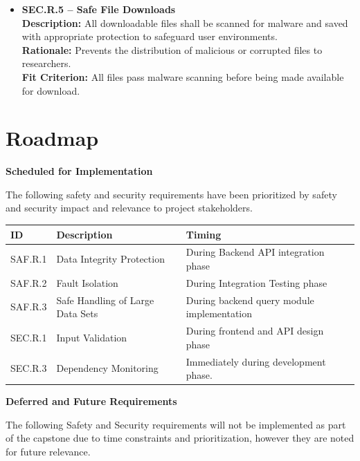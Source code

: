 \documentclass{article}
\begin{document}
\begin{itemize}
    \item \textbf{SEC.R.5 -- Safe File Downloads} \\
    \textbf{Description:} All downloadable files shall be scanned for malware and saved with appropriate protection to safeguard user environments. \\
    \textbf{Rationale:} Prevents the distribution of malicious or corrupted files to researchers. \\
    \textbf{Fit Criterion:} All files pass malware scanning before being made available for download.
\end{itemize}


\pagebreak

\section{Roadmap}


\textbf{Scheduled for Implementation}
\par{The following safety and security requirements have been prioritized by safety and security impact and relevance to project stakeholders. }

\begin{table}[h!]
\begin{tabularx}{\textwidth}{ X X X } 
    \textbf{ID} & \textbf{Description} & \textbf{Timing} \\
    \hline
    SAF.R.1 & Data Integrity Protection &  During Backend API integration phase   \\
    \hline 
    SAF.R.2 & Fault Isolation & During Integration Testing phase \\ 
    \hline 
    SAF.R.3 & Safe Handling  of Large Data Sets &  During backend query module implementation \\
    \hline
    SEC.R.1 & Input Validation & During frontend and API design phase \\ 
    \hline 
    SEC.R.3 & Dependency Monitoring & Immediately during development phase. \\
    \hline 
\end{tabularx}
\end{table}



\vspace{\baselineskip}

\textbf{Deferred and Future Requirements}

\par{
The following Safety and Security requirements will not be implemented as part of the capstone due to time constraints and prioritization, however they are noted for future relevance.  
}
\end{document}
